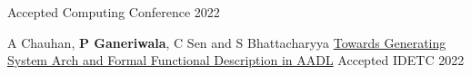 \begin{cventries}
{Accepted}
{Computing Conference 2022} 
{ %
\begin{cvitems}
\end{cvitems}
}
\cventry
{A Chauhan, \textbf{P Ganeriwala}, C Sen and S Bhattacharyya}
{\href{https://asmedigitalcollection.asme.org/IDETC-CIE/proceedings-abstract/IDETC-CIE2022/86212/1150294}{Towards Generating System Arch and Formal Functional Description in AADL}}
{Accepted}
{IDETC 2022} 
{ %
\begin{cvitems}
\end{cvitems}
}


\end{cventries}